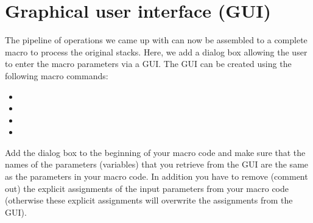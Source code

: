 \section{Graphical user interface (GUI)}
\label{sec:mod8lab1}

The pipeline of operations we came up with can now be assembled to a complete macro to process the original stacks. Here, we add a dialog box allowing the user to enter the macro parameters via a GUI. The GUI can be created using the following macro commands:

\begin{itemize}
\item {}
\item {}
\item {}
\item {}
\end{itemize}
Add the dialog box to the beginning of your macro code and make sure that the names of the parameters (variables) that you retrieve from the GUI are the same as the parameters in your macro code. In addition you have to remove (comment out) the explicit assignments of the input parameters from your macro code (otherwise these explicit assignments will overwrite the assignments from the GUI).

